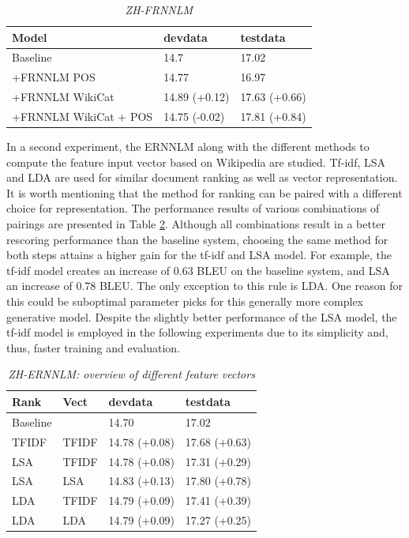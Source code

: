 \documentclass[a4paper]{article}
\begin{document}
\begin{table}
\caption{\it ZH-FRNNLM}
\vspace{2mm}
\centering
  \begin{tabular}{ lll }
  	\hline
  	Model                 & devdata       & testdata      \\ \hline\hline
  	Baseline              & 14.7          & 17.02         \\
  	+FRNNLM POS           & 14.77         & 16.97         \\ \hline
  	+FRNNLM WikiCat       & 14.89 (+0.12) & 17.63 (+0.66) \\
  	+FRNNLM WikiCat + POS & 14.75 (-0.02) & 17.81 (+0.84) \\ \hline
  \end{tabular}
  \label{tb:zh-factored}
\end{table}

In a second experiment, the ERNNLM along with the different methods to compute the feature input vector based on Wikipedia are studied. Tf-idf, LSA and LDA are used for similar document ranking as well as vector representation. It is worth mentioning that the method for ranking can be paired with a different choice for representation. The performance results of various combinations of pairings are presented in Table \ref{tb:zh-extended-diff-features}. Although all combinations result in a better rescoring performance than the baseline system, choosing the same method for both steps attains a higher gain for the tf-idf and LSA model. For example, the tf-idf model creates an increase of 0.63 BLEU on the baseline system, and LSA an increase of 0.78 BLEU. The only exception to this rule is LDA. One reason for this could be suboptimal parameter picks for this generally more complex generative model. Despite the slightly better performance of the LSA model, the tf-idf model is employed in the following experiments due to its simplicity and, thus, faster training and evaluation.

\begin{table}
\caption{\it ZH-ERNNLM: overview of different feature vectors}
\vspace{2mm}
\centering
  \begin{tabular}{llll}
  	\hline
  	Rank     & Vect  & devdata       & testdata      \\ \hline\hline
  	Baseline &       & 14.70         & 17.02         \\ \hline
  	TFIDF    & TFIDF & 14.78 (+0.08) & 17.68 (+0.63) \\
  	LSA      & TFIDF & 14.78 (+0.08) & 17.31 (+0.29) \\
  	LSA      & LSA   & 14.83 (+0.13) & 17.80 (+0.78) \\
  	LDA      & TFIDF & 14.79 (+0.09) & 17.41 (+0.39) \\
  	LDA      & LDA   & 14.79 (+0.09) & 17.27 (+0.25)
  \end{tabular}
  \label{tb:zh-extended-diff-features}
\end{table}
\end{document}
